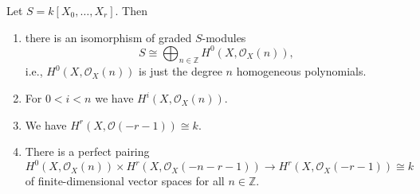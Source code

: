 Let $S = k[X_0, \ldots, X_r]$. Then
\begin{enumerate}
	\item there is an isomorphism of graded $S$-modules
		\[ S\cong \bigoplus_{n \in \mathbb{Z}} H^0(X, \mathcal{O}_X(n)), \]
		i.e., $H^0(X, \mathcal{O}_X(n))$ is just the degree $n$ homogeneous
		polynomials.
	\item For $0 < i < n$ we have $H^i(X, \mathcal{O}_X(n))$.
	\item We have $H^r(X, \mathcal{O}(-r-1))\cong k$.
	\item There is a perfect pairing
		\[ H^0(X, \mathcal{O}_X(n))\times H^r(X, \mathcal{O}_X(-n-r-1)) \to H^r(X, \mathcal{O}_X(-r-1)) \cong k \]
		of finite-dimensional vector spaces for all $n \in \mathbb{Z}$.
\end{enumerate}
